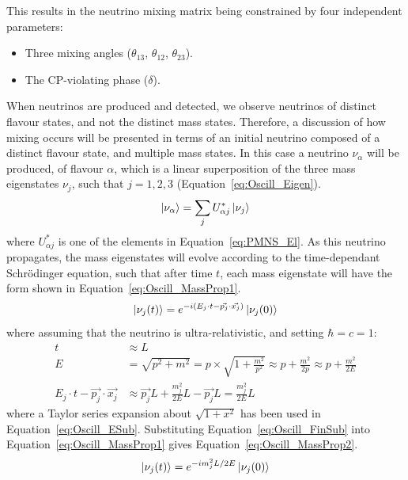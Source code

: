 This results in the neutrino mixing matrix being constrained by four independent parameters:
\begin{itemize}
 \item Three mixing angles ($\theta_{13}$, $\theta_{12}$, $\theta_{23}$).
 \item The CP-violating phase ($\delta$).
\end{itemize}

When neutrinos are produced and detected, we observe neutrinos of distinct flavour states, and not the distinct mass states. Therefore, a discussion of how mixing occurs will be presented in terms of an initial neutrino composed of a distinct flavour state, and multiple mass states. In this case a neutrino $\nu_\alpha$ will be produced, of flavour $\alpha$, which is a linear superposition of the three mass eigenstates $\nu_j$, such that $j=1,2,3$ (Equation~\ref{eq:Oscill_Eigen}). 
\begin{equation}
  \label{eq:Oscill_Eigen}
  \ket{\nu_\alpha} = \sum_{j}U^{\ast}_{\alpha j}\ket{\nu_j}
\end{equation}
where $U^{\ast}_{\alpha j}$ is one of the elements in Equation~\ref{eq:PMNS_El}. As this neutrino propagates, the mass eigenstates will evolve according to the time-dependant Schr\"{o}dinger equation, such that after time $t$, each mass eigenstate will have the form shown in Equation~\ref{eq:Oscill_MassProp1}.
\begin{equation}
  \label{eq:Oscill_MassProp1}
  \ket{\nu_j(t)} = e^{-i(E_{j}\cdot t - \vec{p_{j}}\cdot\vec{x_{j}})}\ket{\nu_j(0)}
\end{equation}
where assuming that the neutrino is ultra-relativistic, and setting $\hbar=c=1$:
\begin{align}
  t &\approx L \label{eq:Oscill_t2L} \\
  E &= \sqrt{p^2+m^2} = p \times \sqrt{1+\frac{m^2}{p^2}} \approx p + \frac{m^2}{2p} \approx p + \frac{m^2}{2E} \label{eq:Oscill_ESub} \\
  E_{j}\cdot t - \vec{p_{j}}\cdot\vec{x_{j}} &\approx \vec{p_{j}}L + \frac{m_{j}^2}{2E}L - \vec{p_{j}}L = \frac{m_{j}^2}{2E}L \label{eq:Oscill_FinSub}  
\end{align}
where a Taylor series expansion about $\sqrt{1+x^2}$ has been used in Equation~\ref{eq:Oscill_ESub}. Substituting Equation~\ref{eq:Oscill_FinSub} into Equation~\ref{eq:Oscill_MassProp1} gives Equation~\ref{eq:Oscill_MassProp2}.
\begin{equation}
  \label{eq:Oscill_MassProp2}
  \ket{\nu_j(t)} = e^{-im_{j}^{2}L/2E}\ket{\nu_j(0)}
\end{equation}
